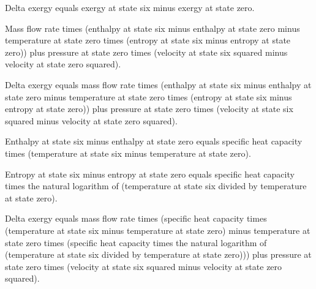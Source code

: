 Delta exergy equals exergy at state six minus exergy at state zero.  

Mass flow rate times (enthalpy at state six minus enthalpy at state zero minus temperature at state zero times (entropy at state six minus entropy at state zero)) plus pressure at state zero times (velocity at state six squared minus velocity at state zero squared).  

Delta exergy equals mass flow rate times (enthalpy at state six minus enthalpy at state zero minus temperature at state zero times (entropy at state six minus entropy at state zero)) plus pressure at state zero times (velocity at state six squared minus velocity at state zero squared).  

Enthalpy at state six minus enthalpy at state zero equals specific heat capacity times (temperature at state six minus temperature at state zero).  

Entropy at state six minus entropy at state zero equals specific heat capacity times the natural logarithm of (temperature at state six divided by temperature at state zero).  

Delta exergy equals mass flow rate times (specific heat capacity times (temperature at state six minus temperature at state zero) minus temperature at state zero times (specific heat capacity times the natural logarithm of (temperature at state six divided by temperature at state zero))) plus pressure at state zero times (velocity at state six squared minus velocity at state zero squared).
